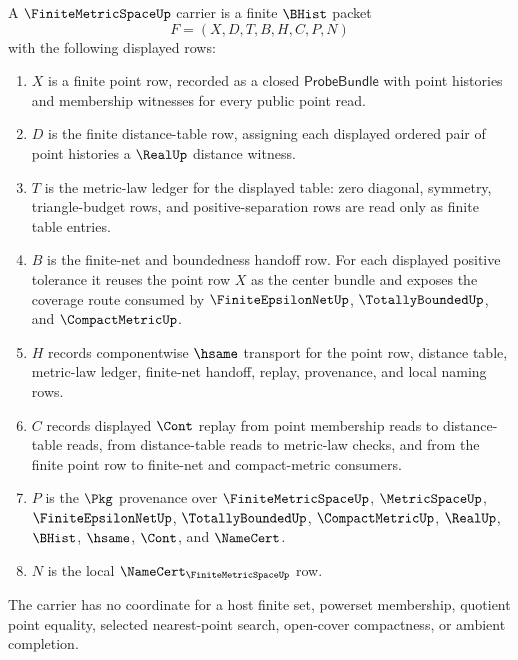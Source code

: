 \begin{definition}
\label{def:finite-metric-space-carrier}
A $\FiniteMetricSpaceUp$ carrier is a finite $\BHist$ packet
$$
F=(X,D,T,B,H,C,P,N)
$$
with the following displayed rows:
\begin{enumerate}
\item $X$ is a finite point row, recorded as a closed $\mathsf{ProbeBundle}$ with point histories and membership witnesses for every public point read.
\item $D$ is the finite distance-table row, assigning each displayed ordered pair of point histories a $\RealUp$ distance witness.
\item $T$ is the metric-law ledger for the displayed table: zero diagonal, symmetry, triangle-budget rows, and positive-separation rows are read only as finite table entries.
\item $B$ is the finite-net and boundedness handoff row. For each displayed positive tolerance it reuses the point row $X$ as the center bundle and exposes the coverage route consumed by $\FiniteEpsilonNetUp$, $\TotallyBoundedUp$, and $\CompactMetricUp$.
\item $H$ records componentwise $\hsame$ transport for the point row, distance table, metric-law ledger, finite-net handoff, replay, provenance, and local naming rows.
\item $C$ records displayed $\Cont$ replay from point membership reads to distance-table reads, from distance-table reads to metric-law checks, and from the finite point row to finite-net and compact-metric consumers.
\item $P$ is the $\Pkg$ provenance over $\FiniteMetricSpaceUp$, $\MetricSpaceUp$, $\FiniteEpsilonNetUp$, $\TotallyBoundedUp$, $\CompactMetricUp$, $\RealUp$, $\BHist$, $\hsame$, $\Cont$, and $\NameCert$.
\item $N$ is the local $\NameCert_{\FiniteMetricSpaceUp}$ row.
\end{enumerate}
The carrier has no coordinate for a host finite set, powerset membership, quotient point equality, selected nearest-point search, open-cover compactness, or ambient completion.
\end{definition}


